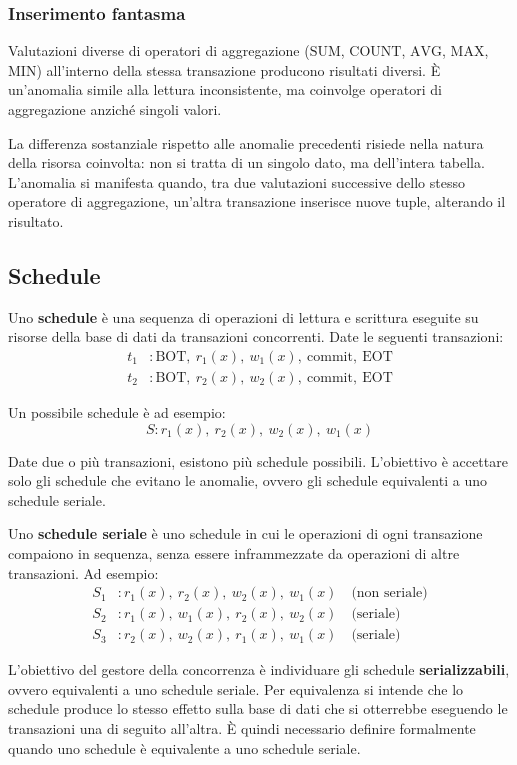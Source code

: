 \subsubsection{Inserimento fantasma}

Valutazioni diverse di operatori di aggregazione ($\text{SUM}$, $\text{COUNT}$, $\text{AVG}$, $\text{MAX}$, $\text{MIN}$) all'interno della stessa transazione producono risultati diversi. È un'anomalia simile alla lettura inconsistente, ma coinvolge operatori di aggregazione anziché singoli valori.

La differenza sostanziale rispetto alle anomalie precedenti risiede nella natura della risorsa coinvolta: non si tratta di un singolo dato, ma dell'intera tabella. L'anomalia si manifesta quando, tra due valutazioni successive dello stesso operatore di aggregazione, un'altra transazione inserisce nuove tuple, alterando il risultato.
\subsection{Schedule}

Uno \textbf{schedule} è una sequenza di operazioni di lettura e scrittura eseguite su risorse della base di dati da transazioni concorrenti. Date le seguenti transazioni:
\begin{align*}
	t_1 &: \text{BOT},\ r_1(x),\ w_1(x),\ \text{commit},\ \text{EOT} \\
	t_2 &: \text{BOT},\ r_2(x),\ w_2(x),\ \text{commit},\ \text{EOT}
\end{align*}

Un possibile schedule è ad esempio:
\[
S: r_1(x),\ r_2(x),\ w_2(x),\ w_1(x)
\]

Date due o più transazioni, esistono più schedule possibili. L'obiettivo è accettare solo gli schedule che evitano le anomalie, ovvero gli schedule equivalenti a uno schedule seriale.

Uno \textbf{schedule seriale} è uno schedule in cui le operazioni di ogni transazione compaiono in sequenza, senza essere inframmezzate da operazioni di altre transazioni. Ad esempio:
\begin{align*}
	S_1 &: r_1(x),\ r_2(x),\ w_2(x),\ w_1(x) \quad \text{(non seriale)} \\
	S_2 &: r_1(x),\ w_1(x),\ r_2(x),\ w_2(x) \quad \text{(seriale)} \\
	S_3 &: r_2(x),\ w_2(x),\ r_1(x),\ w_1(x) \quad \text{(seriale)}
\end{align*}

L'obiettivo del gestore della concorrenza è individuare gli schedule \textbf{serializzabili}, ovvero equivalenti a uno schedule seriale. Per equivalenza si intende che lo schedule produce lo stesso effetto sulla base di dati che si otterrebbe eseguendo le transazioni una di seguito all'altra. È quindi necessario definire formalmente quando uno schedule è equivalente a uno schedule seriale.
